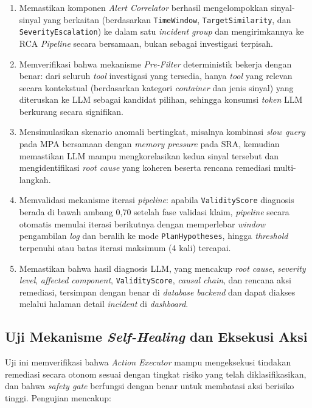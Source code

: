 \begin{enumerate}[label=\arabic*., leftmargin=*]
  \item Memastikan komponen \textit{Alert Correlator} berhasil mengelompokkan sinyal-sinyal yang berkaitan (berdasarkan \texttt{TimeWindow}, \texttt{TargetSimilarity}, dan \texttt{SeverityEscalation}) ke dalam satu \textit{incident group} dan mengirimkannya ke RCA \textit{Pipeline} secara bersamaan, bukan sebagai investigasi terpisah.
  \item Memverifikasi bahwa mekanisme \textit{Pre-Filter} deterministik bekerja dengan benar: dari seluruh \textit{tool} investigasi yang tersedia, hanya \textit{tool} yang relevan secara kontekstual (berdasarkan kategori \textit{container} dan jenis sinyal) yang diteruskan ke LLM sebagai kandidat pilihan, sehingga konsumsi \textit{token} LLM berkurang secara signifikan.
  \item Mensimulasikan skenario anomali bertingkat, misalnya kombinasi \textit{slow query} pada MPA bersamaan dengan \textit{memory pressure} pada SRA, kemudian memastikan LLM mampu mengkorelasikan kedua sinyal tersebut dan mengidentifikasi \textit{root cause} yang koheren beserta rencana remediasi multi-langkah.
  \item Memvalidasi mekanisme iterasi \textit{pipeline}: apabila \texttt{ValidityScore} diagnosis berada di bawah ambang 0,70 setelah fase validasi klaim, \textit{pipeline} secara otomatis memulai iterasi berikutnya dengan memperlebar \textit{window} pengambilan \textit{log} dan beralih ke mode \texttt{PlanHypotheses}, hingga \textit{threshold} terpenuhi atau batas iterasi maksimum (4 kali) tercapai.
  \item Memastikan bahwa hasil diagnosis LLM, yang mencakup \textit{root cause}, \textit{severity level}, \textit{affected component}, \texttt{ValidityScore}, \textit{causal chain}, dan rencana aksi remediasi, tersimpan dengan benar di \textit{database} \textit{backend} dan dapat diakses melalui halaman detail \textit{incident} di \textit{dashboard}.
\end{enumerate}

\subsection{Uji Mekanisme \textit{Self-Healing} dan Eksekusi Aksi}

Uji ini memverifikasi bahwa \textit{Action Executor} mampu mengeksekusi tindakan remediasi secara otonom sesuai dengan tingkat risiko yang telah diklasifikasikan, dan bahwa \textit{safety gate} berfungsi dengan benar untuk membatasi aksi berisiko tinggi. Pengujian mencakup:

